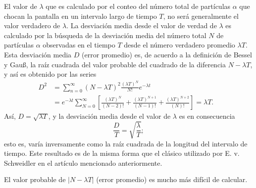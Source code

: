 El valor de $\lambda$ que es calculado por el conteo del número total de partículas $\alpha$ que chocan la pantalla en un intervalo largo de tiempo $T$, no será generalmente el valor verdadero de $\lambda$. La desviación media desde el valor de verdad de $\lambda$ es calculado por la búsqueda de la desviación media del número total $N$ de partículas $\alpha$ observadas en el tiempo $T$ desde el número verdadero promedio $\lambda T$. Esta desviación media $D$ (error promedio) es, de acuerdo a la definición de Bessel y Gau\ss, la raíz cuadrada del valor probable del cuadrado de la diferencia $N-\lambda T$, y así es obtenido por las series %
\begin{align*}
	D^2
	&=\sum_{n=0}^{\infty}\left(N-\lambda T\right)^2\frac{{\left(\lambda T\right)}^N}{N!}e^{-\lambda t} &\\
	&=e^{-\lambda t}\sum_{N=0}^{\infty}\left[\frac{{\left(\lambda T\right)}^N}{\left(N-2\right)!}+\frac{{\left(\lambda T\right)}^{N+1}}{\left(N-1\right)!}+\frac{{\left(\lambda T\right)}^{N+2}}{\left(N\right)!}\right]=\lambda T.
\end{align*}
Así, $D=\sqrt{\lambda T}$, y la desviación media desde el valor de $\lambda$ es en consecuencia
\begin{equation*}
  \frac{D}{T}=\sqrt{\frac{\lambda}{T}};
\end{equation*}
esto es, varía inversamente como la raíz cuadrada de la longitud del intervalo de tiempo. Este resultado es de la misma forma que el clásico utilizado por E. v. Schweidler en el artículo  mencionado anteriormente.

El valor probable de $|N-\lambda T|$ (error promedio) es mucho más difícil de calcular.


